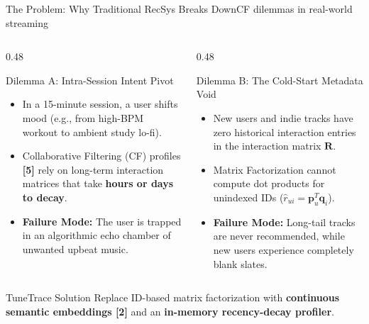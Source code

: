 \documentclass[aspectratio=169,10pt]{beamer}
\begin{document}
\begin{frame}{The Problem: Why Traditional RecSys Breaks Down}{CF dilemmas in real-world streaming}
    \begin{columns}[T]
        \begin{column}{0.48\textwidth}
            \begin{alertblock}{Dilemma A: Intra-Session Intent Pivot}
                \begin{itemize}\small
                    \item In a 15-minute session, a user shifts mood (e.g., from high-BPM workout to ambient study lo-fi).
                    \item Collaborative Filtering (CF) profiles \textbf{[5]} rely on long-term interaction matrices that take \textbf{hours or days to decay}.
                    \item \textbf{Failure Mode:} The user is trapped in an algorithmic echo chamber of unwanted upbeat music.
                \end{itemize}
            \end{alertblock}
        \end{column}

        \begin{column}{0.48\textwidth}
            \begin{alertblock}{Dilemma B: The Cold-Start Metadata Void}
                \begin{itemize}\small
                    \item New users and indie tracks have zero historical interaction entries in the interaction matrix $\mathbf{R}$.
                    \item Matrix Factorization cannot compute dot products for unindexed IDs ($\hat{r}_{ui} = \mathbf{p}_u^T \mathbf{q}_i$).
                    \item \textbf{Failure Mode:} Long-tail tracks are never recommended, while new users experience completely blank slates.
                \end{itemize}
            \end{alertblock}
        \end{column}
    \end{columns}

    \vspace{0.05cm}
    \begin{exampleblock}{TuneTrace Solution}
        \small Replace ID-based matrix factorization with \textbf{continuous semantic embeddings [2]} and an \textbf{in-memory recency-decay profiler}.
    \end{exampleblock}
\end{frame}
\end{document}
